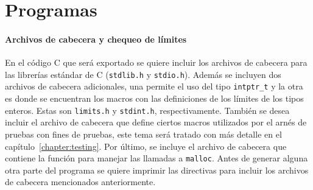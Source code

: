 \begin{comment}
                                                                                                               & \verb|=================| \\
                                                                                                               & \verb|1: <free>| \\
                                                                                                               & \verb|2: [44, *2[0]]| \\
                                                                                                               & \verb|3: [78]| \\
  \hline
\end{tabular}

\caption{Ejemplo de \textit{pretty printing} para un estado}
\label{tab:pretty_simp_state}
\end{table}
\end{comment}


\section{Programas}

\begin{comment}
En esta sección se discute la traducción de un programa completo.
\end{comment}

\paragraph*{Archivos de cabecera y chequeo de límites}

En el código C que será exportado se quiere incluir los archivos de cabecera para las librerías estándar de C (\verb|stdlib.h| y \verb|stdio.h|).
Además se incluyen dos archivos de cabecera adicionales, una permite el uso del tipo \verb|intptr_t| y la otra es donde se encuentran los macros con las definiciones de los límites de los tipos enteros.
Estas son \verb|limits.h| y \verb|stdint.h|, respectivamente.
También se desea incluir el archivo de cabecera que define ciertos macros utilizados por el arnés de pruebas con fines de pruebas, este tema será tratado con más detalle en el capítulo~\ref{chapter:testing}.
Por último, se incluye el archivo de cabecera que contiene la función para manejar las llamadas a \verb|malloc|.
Antes de generar alguna otra parte del programa se quiere imprimir las directivas para incluir los archivos de cabecera mencionados anteriormente.


